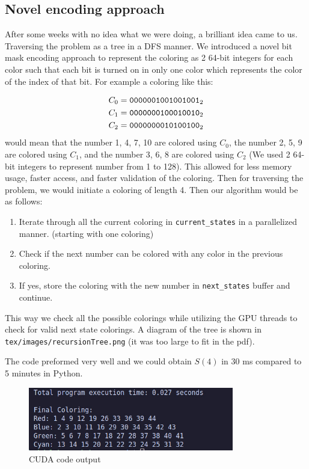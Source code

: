 \documentclass[12pt]{article}
\begin{document}
\subsection{Novel encoding approach}
After some weeks with no idea what we were doing, a brilliant idea came to us. Traversing the problem as a tree in a DFS manner. We introduced a novel bit mask encoding approach to represent the coloring as 2 64-bit integers for each color such that each bit is turned on in only one color which represents the color of the index of that bit. For example a coloring like this: 

\begin{align*}
\centering
C_0 &= \texttt{0000001001001001}_2 \\
C_1 &= \texttt{0000000100010010}_2 \\
C_2 &= \texttt{0000000010100100}_2 \\
\end{align*}
would mean that the number 1, 4, 7, 10 are colored using $C_0$, the number 2, 5, 9 are colored using $C_1$, and the number 3, 6, 8 are colored using $C_2$ (We used 2 64-bit integers to represent number from 1 to 128). This allowed for less memory usage, faster access, and faster validation of the coloring. Then for traversing the problem, we would initiate a coloring of length 4. Then our algorithm would be as follows:
\begin{enumerate}
    \item Iterate through all the current coloring in \texttt{current\_states} in a parallelized manner. (starting with one coloring)
    \item Check if the next number can be colored with any color in the previous coloring.
    \item If yes, store the coloring with the new number in \texttt{next\_states} buffer and continue.
\end{enumerate}  
This way we check all the possible colorings while utilizing the GPU threads to check for valid next state colorings. A diagram of the tree is shown in \texttt{tex/images/recursionTree.png} (it was too large to fit in the pdf).

The code preformed very well and we could obtain $S(4)$ in 30 ms compared to 5 minutes in Python. 
\begin{figure}[h]
    \centering
    \includegraphics[width=0.8\textwidth]{images/finalCUDAwithTime.jpeg}
    \caption{CUDA code output}
    \label{fig:CUDA_time}
\end{figure}
\end{document}
